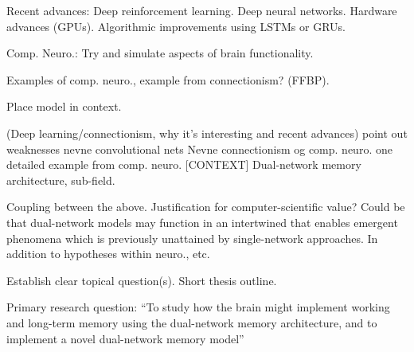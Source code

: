 Recent advances: Deep reinforcement learning. Deep neural networks. Hardware advances (GPUs). Algorithmic improvements using LSTMs or GRUs.

Comp. Neuro.: Try and simulate aspects of brain functionality.

Examples of comp. neuro., example from connectionism? (FFBP).

Place model in context.



(Deep learning/connectionism, why it’s interesting and recent advances)
point out weaknesses
nevne convolutional nets
Nevne connectionism og comp. neuro.
one detailed example from comp. neuro. [CONTEXT]
Dual-network memory architecture, sub-field.

Coupling between the above. Justification for computer-scientific value? 
Could be that dual-network models may function in an intertwined that enables emergent phenomena which is previously unattained by single-network approaches. In addition to hypotheses within neuro., etc.

Establish clear topical question(s).
Short thesis outline.

Primary research question: “To study how the brain might implement working and long-term memory using the dual-network memory architecture, and to implement a novel dual-network memory model”


\cleardoublepage